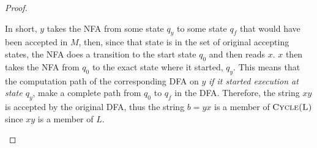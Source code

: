 \begin{problem}
\begin{Answer}
\begin{claim}
\begin{proof}
\begin{enumroman}
            \step
            In short, $y$ takes the NFA from some state $q_y$ to some state $q_f$ that would have been accepted
            in $M$, then, since that state is in the set of original accepting states,
            the NFA does a transition to the start state $q_0$ and then reads $x$.
            $x$ then takes the NFA from $q_0$ to the exact state where it started, $q_y$.
            This means that the computation path of the corresponding DFA on $y$
            \emph{if it started execution at state $q_y$},
            make a complete path from $q_0$ to $q_f$ in the DFA. Therefore, the string
            $xy$ is accepted by the original DFA, thus  the string $b = yx$
            is a member of $\textsc{Cycle(L)}$ since $xy$ is a member of $L$.
        \end{enumroman}
      \end{proof}
    \end{claim}
  \end{Answer}
\end{problem}
